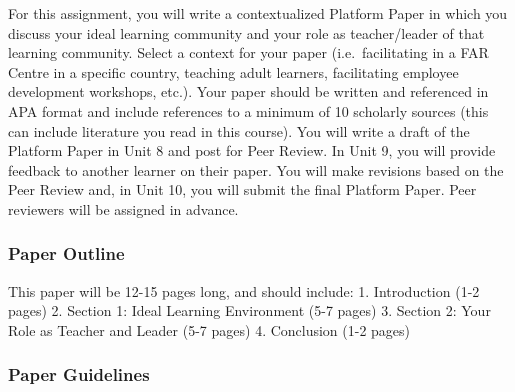 \documentclass[
]{book}
\begin{document}
\begin{assessment}
For this assignment, you will write a contextualized Platform Paper in
which you discuss your ideal learning community and your role as
teacher/leader of that learning community. Select a context for your
paper (i.e.~facilitating in a FAR Centre in a specific country, teaching
adult learners, facilitating employee development workshops, etc.). Your
paper should be written and referenced in APA format and include
references to a minimum of 10 scholarly sources (this can include
literature you read in this course). You will write a draft of the
Platform Paper in Unit 8 and post for Peer Review. In Unit 9, you will
provide feedback to another learner on their paper. You will make
revisions based on the Peer Review and, in Unit 10, you will submit the
final Platform Paper. Peer reviewers will be assigned in advance.

\hypertarget{paper-outline}{%
\subsubsection{Paper Outline}\label{paper-outline}}

This paper will be 12-15 pages long, and should include: 1. Introduction
(1-2 pages) 2. Section 1: Ideal Learning Environment (5-7 pages) 3.
Section 2: Your Role as Teacher and Leader (5-7 pages) 4. Conclusion
(1-2 pages)

\hypertarget{paper-guidelines}{%
\subsubsection{Paper Guidelines}\label{paper-guidelines}}


\end{assessment}
\end{document}

